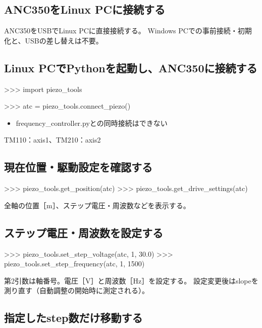 \documentclass[a4paper,11pt]{ltjsarticle}
\begin{document}
\subsection{ANC350をLinux PCに接続する}

ANC350をUSBでLinux PCに直接接続する。
Windows PCでの事前接続・初期化と、USBの差し替えは不要。

\subsection{Linux PCでPythonを起動し、ANC350に接続する}

\begin{command}

>>> import piezo_tools

>>> atc = piezo_tools.connect_piezo()

\end{command}

\begin{itemize}

\item frequency\_controller.pyとの同時接続はできない

\end{itemize}

TM110：axis1、TM210：axis2


\subsection{現在位置・駆動設定を確認する}

\begin{command}
>>> piezo_tools.get_position(atc)
>>> piezo_tools.get_drive_settings(atc)
\end{command}

全軸の位置［m］、ステップ電圧・周波数などを表示する。

\subsection{ステップ電圧・周波数を設定する}

\begin{command}
>>> piezo_tools.set_step_voltage(atc, 1, 30.0)
>>> piezo_tools.set_step_frequency(atc, 1, 1500)
\end{command}

第2引数は軸番号。電圧［V］と周波数［Hz］を設定する。
設定変更後はslopeを測り直す（自動調整の開始時に測定される）。

\subsection{指定したstep数だけ移動する}
\end{document}
